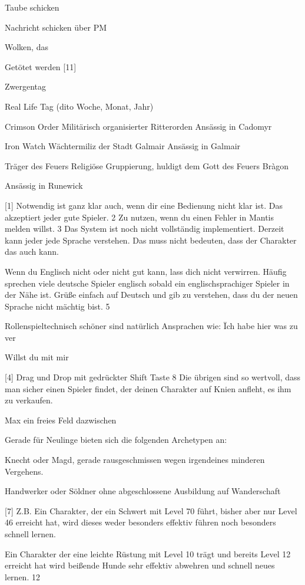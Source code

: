 \documentclass[a4paper,11pt]{book}
\begin{document}
Taube schicken

Nachricht schicken über PM

Wolken, das

Getötet werden [11]

Zwergentag

Real Life Tag (dito Woche, Monat, Jahr)

Crimson Order  Militärisch organisierter Ritterorden Ansässig in Cadomyr

Iron Watch Wächtermiliz der Stadt Galmair Ansässig in Galmair

Träger des Feuers  Religiöse Gruppierung, huldigt dem Gott des Feuers Bràgon

Ansässig in Runewick

[1] Notwendig ist ganz klar auch, wenn dir eine Bedienung nicht klar ist. Das akzeptiert jeder gute Spieler.  2 Zu nutzen, wenn du einen Fehler in Mantis melden willst. 3 Das System ist noch nicht vollständig implementiert. Derzeit kann jeder jede Sprache verstehen. Das muss nicht bedeuten, dass der Charakter das auch kann.

Wenn du Englisch nicht oder nicht gut kann, lass dich nicht verwirren. Häufig sprechen viele deutsche Spieler englisch sobald ein englischsprachiger Spieler in der Nähe ist. Grüße einfach auf Deutsch und gib zu verstehen, dass du der neuen Sprache nicht mächtig bist.  5

Rollenspieltechnisch schöner sind natürlich Ansprachen wie: \"Ich habe hier was zu ver

Willst du mit mir

[4] Drag und Drop mit gedrückter Shift Taste 8 Die übrigen sind so wertvoll, dass man sicher einen Spieler findet, der deinen Charakter auf Knien anfleht, es ihm zu verkaufen.

Max ein freies Feld dazwischen

Gerade für Neulinge bieten sich die folgenden Archetypen an:

Knecht oder Magd, gerade rausgeschmissen wegen irgendeines minderen Vergehens.

Handwerker oder Söldner ohne abgeschlossene Ausbildung auf Wanderschaft

[7] Z.B. Ein Charakter, der ein Schwert mit Level 70 führt, bisher aber nur Level 46 erreicht hat, wird dieses weder besonders effektiv führen noch besonders schnell lernen.

Ein Charakter der eine leichte Rüstung mit Level 10 trägt und bereits Level 12 erreicht hat wird beißende Hunde sehr effektiv abwehren und schnell neues lernen.  12
\end{document}
